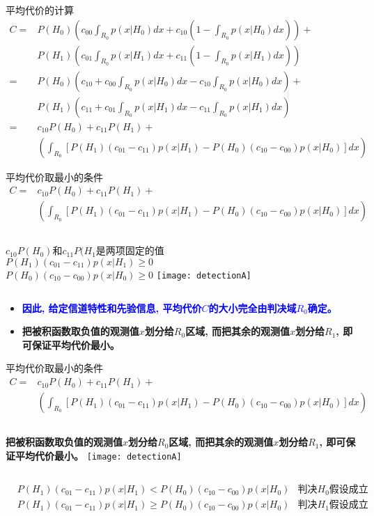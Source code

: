 \begin{frame}[shrink]{平均代价的计算}
\begin{align*}
C=&P(H_0)\left(c_{00}\int_{R_0}p(x|H_0)dx+c_{10}\left(1-\int_{R_0}p(x|H_0)dx\right)\right)+\\
&P(H_1)\left(c_{01}\int_{R_0}p(x|H_1)dx+c_{11}\left(1-\int_{R_0}p(x|H_1)dx\right)\right)\\
=&P(H_0)\left(c_{10}+c_{00}\int_{R_0}p(x|H_0)dx-c_{10}\int_{R_0}p(x|H_0)dx\right)+\\
&P(H_1)\left(c_{11}+c_{01}\int_{R_0}p(x|H_1)dx-c_{11}\int_{R_0}p(x|H_1)dx\right)\\
=&c_{10}P(H_0)+c_{11}P(H_1)+\\
&\left(\int_{R_0}\left[P({H_1})(c_{01}-c_{11})p(x|H_1)-P(H_0)(c_{10}-c_{00})p(x|H_0)\right]dx \right)
\end{align*}
\end{frame}

\begin{frame}[shrink]{平均代价取最小的条件}
\begin{align*}
C=&c_{10}P(H_0)+c_{11}P(H_1)+\\
&\left(\int_{R_0}\left[P({H_1})(c_{01}-c_{11})p(x|H_1)-P(H_0)(c_{10}-c_{00})p(x|H_0)\right]dx \right)
\end{align*}
\begin{columns}
	$c_{10}P(H_0)$和$c_{11}P(H_1$是两项固定的值\\
	$P({H_1})(c_{01}-c_{11})p(x|H_1)\ge 0$\\
	$P(H_0)(c_{10}-c_{00})p(x|H_0)\ge 0$
	\texttt{[image: detectionA]}
\end{columns}
\begin{itemize}
	\item \textcolor{blue}{\textbf{因此, 给定信道特性和先验信息, 平均代价$C$的大小完全由判决域$R_0$确定。}}
	\item \textbf{把被积函数取负值的观测值$x$划分给$R_0$区域, 而把其余的观测值$x$划分给$R_1$, 即可保证平均代价最小。}
\end{itemize}
\end{frame}

\begin{frame}[shrink]{平均代价取最小的条件}
\begin{align*}
C=&c_{10}P(H_0)+c_{11}P(H_1)+\\
&\left(\int_{R_0}\left[P({H_1})(c_{01}-c_{11})p(x|H_1)-P(H_0)(c_{10}-c_{00})p(x|H_0)\right]dx \right)
\end{align*}
\begin{columns}
	\textbf{把被积函数取负值的观测值$x$划分给$R_0$区域, 而把其余的观测值$x$划分给$R_1$, 即可保证平均代价最小。}
	\texttt{[image: detectionA]}
\end{columns}
\begin{align*}
&P({H_1})(c_{01}-c_{11})p(x|H_1)< P(H_0)(c_{10}-c_{00})p(x|H_0)&\textbf{判决$H_0$假设成立}\\
&P({H_1})(c_{01}-c_{11})p(x|H_1)\ge P(H_0)(c_{10}-c_{00})p(x|H_0)&\textbf{判决$H_1$假设成立}
\end{align*}
\end{frame}

